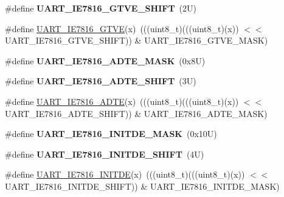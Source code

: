 \begin{DoxyCompactItemize}
\mbox{\label{group___u_a_r_t___register___masks_ga92681ae737e84944e46e525a831303b9}} 
\#define {\bfseries U\+A\+R\+T\+\_\+\+I\+E7816\+\_\+\+G\+T\+V\+E\+\_\+\+S\+H\+I\+FT}~(2\+U)
\item 
\#define \mbox{\hyperlink{group___u_a_r_t___register___masks_ga3b3565dc080fe2075a27f7fab807a2e5}{U\+A\+R\+T\+\_\+\+I\+E7816\+\_\+\+G\+T\+VE}}(x)~(((uint8\+\_\+t)(((uint8\+\_\+t)(x)) $<$$<$ U\+A\+R\+T\+\_\+\+I\+E7816\+\_\+\+G\+T\+V\+E\+\_\+\+S\+H\+I\+FT)) \& U\+A\+R\+T\+\_\+\+I\+E7816\+\_\+\+G\+T\+V\+E\+\_\+\+M\+A\+SK)
\item 
\mbox{\label{group___u_a_r_t___register___masks_ga43276e693ac6c3a08896783e340bcde4}} 
\#define {\bfseries U\+A\+R\+T\+\_\+\+I\+E7816\+\_\+\+A\+D\+T\+E\+\_\+\+M\+A\+SK}~(0x8\+U)
\item 
\mbox{\label{group___u_a_r_t___register___masks_ga7bce3db9774940ac81b2596fb0a430d0}} 
\#define {\bfseries U\+A\+R\+T\+\_\+\+I\+E7816\+\_\+\+A\+D\+T\+E\+\_\+\+S\+H\+I\+FT}~(3\+U)
\item 
\#define \mbox{\hyperlink{group___u_a_r_t___register___masks_gab4c33943d2e28a7d4419e55332468359}{U\+A\+R\+T\+\_\+\+I\+E7816\+\_\+\+A\+D\+TE}}(x)~(((uint8\+\_\+t)(((uint8\+\_\+t)(x)) $<$$<$ U\+A\+R\+T\+\_\+\+I\+E7816\+\_\+\+A\+D\+T\+E\+\_\+\+S\+H\+I\+FT)) \& U\+A\+R\+T\+\_\+\+I\+E7816\+\_\+\+A\+D\+T\+E\+\_\+\+M\+A\+SK)
\item 
\mbox{\label{group___u_a_r_t___register___masks_ga6e0fc67109bbfda4ecffbb29a7bdcac7}} 
\#define {\bfseries U\+A\+R\+T\+\_\+\+I\+E7816\+\_\+\+I\+N\+I\+T\+D\+E\+\_\+\+M\+A\+SK}~(0x10\+U)
\item 
\mbox{\label{group___u_a_r_t___register___masks_ga92e0d4cc206532c7e058e7b0eae64492}} 
\#define {\bfseries U\+A\+R\+T\+\_\+\+I\+E7816\+\_\+\+I\+N\+I\+T\+D\+E\+\_\+\+S\+H\+I\+FT}~(4\+U)
\item 
\#define \mbox{\hyperlink{group___u_a_r_t___register___masks_ga37032c1701a391f5504551e0f0f8c426}{U\+A\+R\+T\+\_\+\+I\+E7816\+\_\+\+I\+N\+I\+T\+DE}}(x)~(((uint8\+\_\+t)(((uint8\+\_\+t)(x)) $<$$<$ U\+A\+R\+T\+\_\+\+I\+E7816\+\_\+\+I\+N\+I\+T\+D\+E\+\_\+\+S\+H\+I\+FT)) \& U\+A\+R\+T\+\_\+\+I\+E7816\+\_\+\+I\+N\+I\+T\+D\+E\+\_\+\+M\+A\+SK)
$$
\end{DoxyCompactItemize}
